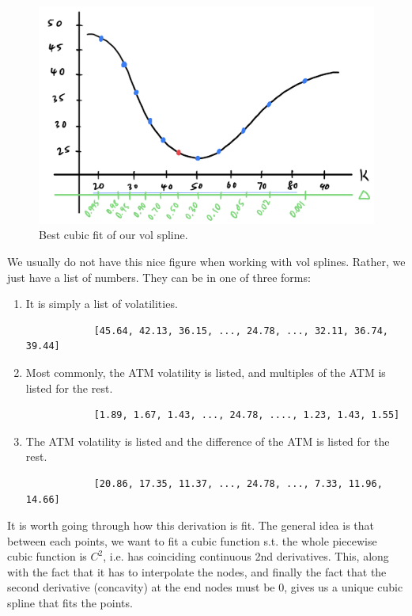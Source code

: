 \documentclass{article}
\begin{document}
\begin{definition}
      \begin{figure}[H]
        \centering 
        \includegraphics[scale=0.4]{img/vol_spline.png}
        \caption{Best cubic fit of our vol spline.} 
        \label{fig:vol_spline}
      \end{figure}
      We usually do not have this nice figure when working with vol splines. Rather, we just have a list of numbers. They can be in one of three forms: 
      \begin{enumerate}
        \item It is simply a list of volatilities. 
          \begin{lstlisting}
            [45.64, 42.13, 36.15, ..., 24.78, ..., 32.11, 36.74, 39.44]
          \end{lstlisting}
        \item Most commonly, the ATM volatility is listed, and multiples of the ATM is listed for the rest. 
          \begin{lstlisting}
            [1.89, 1.67, 1.43, ..., 24.78, ...., 1.23, 1.43, 1.55]
          \end{lstlisting}
        \item The ATM volatility is listed and the difference of the ATM is listed for the rest. 
          \begin{lstlisting}
            [20.86, 17.35, 11.37, ..., 24.78, ..., 7.33, 11.96, 14.66]
          \end{lstlisting}
      \end{enumerate}
    \end{definition} 

    It is worth going through how this derivation is fit. The general idea is that between each points, we want to fit a cubic function s.t. the whole piecewise cubic function is $C^2$, i.e. has coinciding continuous 2nd derivatives. This, along with the fact that it has to interpolate the nodes, and finally the fact that the second derivative (concavity) at the end nodes must be $0$, gives us a unique cubic spline that fits the points. 
\end{document}

